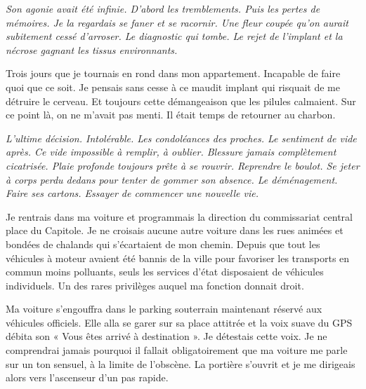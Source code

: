\emph{Son agonie avait été infinie. D'abord les tremblements. Puis les pertes de mémoires. Je la regardais se faner et 
se racornir. Une fleur coupée qu'on aurait subitement cessé d'arroser. Le diagnostic qui tombe. Le rejet de l'implant 
et la nécrose gagnant les tissus environnants.}

Trois jours que je tournais en rond dans mon appartement. Incapable de faire quoi que ce soit. Je pensais sans cesse à 
ce maudit implant qui risquait de me détruire le cerveau. Et toujours cette démangeaison que les pilules calmaient. Sur 
ce point là, on ne m'avait pas menti. Il était temps de retourner au charbon.

\emph{L'ultime décision. Intolérable. Les condoléances des proches. Le sentiment de vide après. Ce vide impossible à 
remplir, à oublier. Blessure jamais complètement cicatrisée. Plaie profonde toujours prête à se rouvrir. Reprendre le 
boulot. Se jeter à corps perdu dedans pour tenter de gommer son absence. Le déménagement. Faire ses cartons. Essayer de 
commencer une nouvelle vie.}

Je rentrais dans ma voiture et programmais la direction du commissariat central place du Capitole. Je ne croisais 
aucune autre voiture dans les rues animées et bondées de chalands qui s'écartaient de mon chemin. Depuis que tout les 
véhicules à moteur avaient été bannis de la ville pour favoriser les transports en commun moins polluants, seuls les 
services d'état disposaient de véhicules individuels. Un des rares privilèges auquel ma fonction donnait droit.

Ma voiture s'engouffra dans le parking souterrain maintenant réservé aux véhicules officiels. Elle alla se garer sur sa 
place attitrée et la voix suave du GPS débita son « Vous êtes arrivé à destination ». Je détestais cette voix. Je ne 
comprendrai jamais pourquoi il fallait obligatoirement que ma voiture me parle sur un ton sensuel, à la limite de 
l'obscène. La portière s'ouvrit et je me dirigeais alors vers l'ascenseur d'un pas rapide.